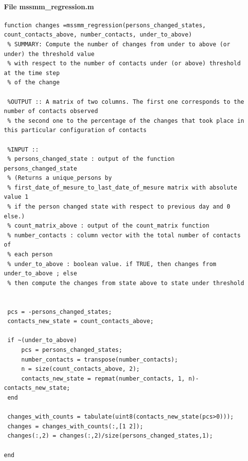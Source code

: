\documentclass[11pt]{article}
\begin{document}
\paragraph{File mssmm\_regression.m}
\begin{verbatim}
function changes =mssmm_regression(persons_changed_states, count_contacts_above, number_contacts, under_to_above)
 % SUMMARY: Compute the number of changes from under to above (or under) the threshold value
 % with respect to the number of contacts under (or above) threshold at the time step
 % of the change
 
 %OUTPUT :: A matrix of two columns. The first one corresponds to the number of contacts observed
 % the second one to the percentage of the changes that took place in this particular configuration of contacts
 
 %INPUT ::
 % persons_changed_state : output of the function persons_changed_state
 % (Returns a unique_persons by
 % first_date_of_mesure_to_last_date_of_mesure matrix with absolute value 1
 % if the person changed state with respect to previous day and 0 else.)
 % count_matrix_above : output of the count_matrix function
 % number_contacts : column vector with the total number of contacts of
 % each person
 % under_to_above : boolean value. if TRUE, then changes from under_to_above ; else
 % then compute the changes from state above to state under threshold

 
 pcs = -persons_changed_states;
 contacts_new_state = count_contacts_above;
 
 if ~(under_to_above)
     pcs = persons_changed_states;
     number_contacts = transpose(number_contacts);
     n = size(count_contacts_above, 2);
     contacts_new_state = repmat(number_contacts, 1, n)-contacts_new_state;
 end
 
 changes_with_counts = tabulate(uint8(contacts_new_state(pcs>0)));
 changes = changes_with_counts(:,[1 2]);
 changes(:,2) = changes(:,2)/size(persons_changed_states,1);
   
end

\end{verbatim}
\end{document}
